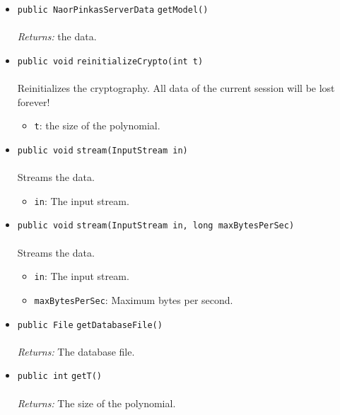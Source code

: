 \begin{itemize}
\item \lstinline|public NaorPinkasServerData| \lstinline|getModel|\lstinline|()|\\ \\[-0.6em]
\emph{Returns:} the data.



\item \lstinline|public void| \lstinline|reinitializeCrypto|\lstinline|(int t)|\\ \\[-0.6em]
Reinitializes the cryptography.
 All data of the current session will be lost forever!
\begin{itemize}
\item \lstinline|t|: the size of the polynomial.
\end{itemize}



\item \lstinline|public void| \lstinline|stream|\lstinline|(InputStream in)|\\ \\[-0.6em]
Streams the data.
\begin{itemize}
\item \lstinline|in|: The input stream.
\end{itemize}



\item \lstinline|public void| \lstinline|stream|\lstinline|(InputStream in, long maxBytesPerSec)|\\ \\[-0.6em]
Streams the data.
\begin{itemize}
\item \lstinline|in|: The input stream.
\item \lstinline|maxBytesPerSec|: Maximum bytes per second.
\end{itemize}



\item \lstinline|public File| \lstinline|getDatabaseFile|\lstinline|()|\\ \\[-0.6em]
\emph{Returns:} The database file.



\item \lstinline|public int| \lstinline|getT|\lstinline|()|\\ \\[-0.6em]
\emph{Returns:} The size of the polynomial.




\end{itemize}
